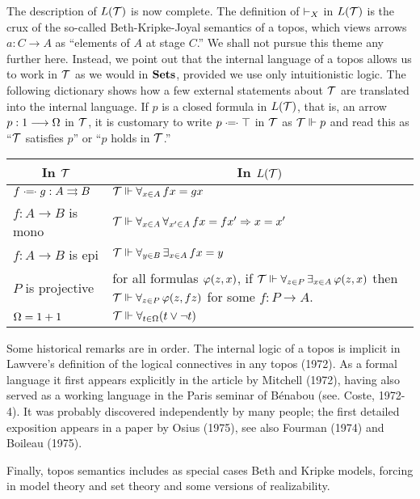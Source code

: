 The description of $L({\mathcal T})$ is now complete.
The definition of $\vdash_X$ in $L({\mathcal T})$ is the crux of the
so-called Beth-Kripke-Joyal semantics of a topos, which
views arrows $a: C \to A$ as ``elements of $A$ at stage $C$.''
We shall not pursue this theme
any further here. Instead, we point out that the internal
language of a topos allows us to work in ${\mathcal T}$ as we would in ${\mathbf {Sets}}$, provided
we use only intuitionistic logic. The following dictionary shows how a few
external statements about ${\mathcal T}$ are translated into the internal language.
If $p$ is a closed formula in $L({\mathcal T})$, that is, an arrow $p: 1 \longrightarrow \Omega$
in ${\mathcal T}$, it is customary to write $p \mathrel{\cdot\!\!=\!\!\cdot} \top$ in ${\mathcal T}$ as
${\mathcal T} \Vdash p$ and read this as ``${\mathcal T}$ satisfies $p$'' or
``$p$ holds in ${\mathcal T}$.''

\begin{center}
\begin{tabular}{ l | l }
\multicolumn{1}{c}{In ${\mathcal T}$} & \multicolumn{1}{c}{In $L({\mathcal T})$} \\
 \hline
 $f \mathrel{\cdot\!\!=\!\!\cdot} g : A \rightrightarrows B$ & ${\mathcal T} \Vdash \forall_{x\in A}\, fx = gx$ \\
 $f: A \to B$ is mono & ${\mathcal T} \Vdash \forall_{x\in A}\, \forall_{x'\in A}\, fx = fx' \Rightarrow x = x'$\\
 $f: A \to B$ is epi & ${\mathcal T} \Vdash \forall_{y\in B}\, \exists_{x\in A}\, fx = y$\\
 $P$ is projective & \begin{minipage}[t]{50mm}
for all formulas $\varphi(z,x)$, if ${\mathcal T} \Vdash \forall_{z\in P}\,\exists_{x \in A}\, \varphi(z,x)$
then ${\mathcal T} \Vdash \forall_{z\in P}\, \varphi(z,fz)$
for some $f : P \to A$.
\end{minipage}\\[3.5em]
$\Omega = 1 + 1$ & ${\mathcal T} \Vdash \forall_{t\in \Omega} (t \vee \neg t)$\\
 \hline
\end{tabular}
\end{center}
\medskip
Some historical remarks are in order. The internal logic of a topos is
implicit in Lawvere's definition of the logical connectives in any topos
(1972). As a formal language it first appears explicitly in the article by
Mitchell (1972), having also served as a working language in the Paris seminar
of B\'enabou (see. Coste, 1972-4). It was probably discovered independently by
many people; the first detailed exposition appears in a paper by Osius (1975),
see also Fourman (1974) and Boileau (1975).

Finally, topos semantics includes as special cases Beth and Kripke models,
forcing in model theory and set theory and some versions of realizability.

